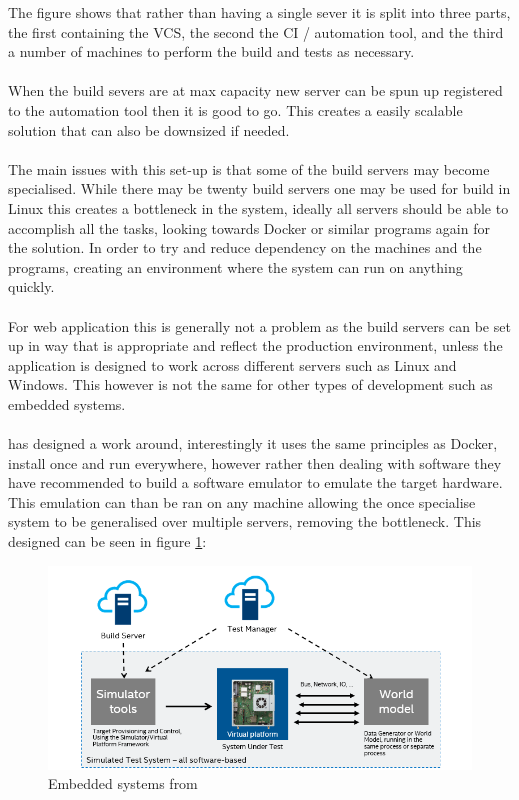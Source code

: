 The figure shows that rather than having a single sever it is split into three parts, the first containing the VCS, the second the CI / automation tool, and the third a number of machines to perform the build and tests as necessary.
\\\\
When the build severs are at max capacity new server can be spun up registered to the automation tool then it is good to go. This creates a easily scalable solution that can also be downsized if needed.
\\\\
The main issues with this set-up is that some of the build servers may become specialised. While there may be twenty build servers one may be used for build in Linux this creates a bottleneck in the system, ideally all servers should be able to accomplish all the tasks, looking towards Docker or similar programs again for the solution. In order to try and reduce dependency on the machines  and the programs, creating an environment where the system can run on anything quickly.
\\\\
For web application this is generally not a problem as the build servers can be set up in way  that is appropriate and reflect the production environment, unless the application is designed to work across different servers such as Linux and Windows. This however is not the same for other types of development such as embedded systems.
\\\\
\cite{intel} has designed a work around, interestingly it uses the same principles as Docker, install once and run everywhere, however rather then dealing with software they have recommended to build a software emulator to emulate the target hardware. This emulation can than be ran on any machine allowing the once specialise system to be generalised over multiple servers, removing the bottleneck. This designed can be seen in figure \ref{fig:intel}:

\begin{figure}[H]
	\centering
	\includegraphics[scale=0.7]{images/intel.png}
	\caption{Embedded systems from \cite{intel}}
	\label{fig:intel}
\end{figure}

